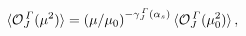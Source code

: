 \begin{equation}
\langle {\cal O}_J^{\, \mit\Gamma} (\mu^2)  \rangle
=
\left( \mu / \mu_0 \right)^{-\gamma_J^{\,\mit\Gamma} (\alpha_s)}
\langle {\cal O}_J^{\,\mit\Gamma} (\mu_0^2) \rangle
\,,
\label{O-sol}
\end{equation}

